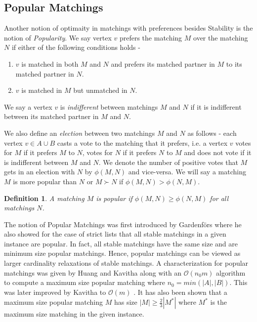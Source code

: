 \documentclass[a4paper,10pt]{article}
\theoremstyle{plain} %
\theoremstyle{plain} %
\newtheorem{definition}{Definition}[section] %
\begin{document}
\subsection{Popular Matchings}
Another notion of optimaity in matchings with preferences besides Stability is the notion of \textit{Popularity}. We say vertex $v$ prefers the matching $M$ over the matching $N$ if either of the following conditions holds - 
\begin{enumerate} [i]
    \item $v$ is matched in both $M$ and $N$ and prefers its matched partner in $M$ to its matched partner in $N$.
    \item $v$ is matched in $M$ but unmatched in $N$.
\end{enumerate}

We say a vertex $v$ is \textit{indifferent} between matchings $M$ and $N$ if it is indifferent between its matched partner in $M$ and $N$.


We also define an \textit{election} between two matchings $M$ and $N$ as follows - each vertex $v \in A \cup B$ casts a vote to the matching that it prefers, i.e. a vertex $v$ votes for $M$ if it prefers $M$ to $N$, votes for $N$ if it prefers $N$ to $M$ and does not vote if it is indifferent between $M$ and $N$. We denote the number of positive votes that $M$ gets in an election with $N$ by $\phi(M, N)$ and vice-versa. We will say a matching $M$ is more popular than $N$ or $M \succ N$ if $\phi(M, N) > \phi(N, M)$.

\begin{definition}
    A matching $M$ is popular if $\phi(M, N) \geq \phi(N, M)$ for all matchings $N$.
\end{definition}

The notion of Popular Matchings was first introduced by Gardenf\"ors \cite{gardenfors1975match} where he also showed for the case of strict lists that all stable matchings in a given instance are popular. In fact, all stable matchings have the same size \cite{gale1985some} and are minimum size popular matchings. Hence, popular matchings can be viewed as larger cardinality relaxations of stable matchings. A characterization for popular matchings was given by Huang and Kavitha \cite{huang2013popular} along with an $\mathcal{O}(n_0m)$ algorithm to compute a maximum size popular matching where $n_0 = min(|A|, |B|)$. This was later improved by Kavitha to $\mathcal{O}(m)$ \cite{kavitha2014size}. It has also been shown that a maximum size popular matching $M$ has size $|M| \geq \frac{2}{3}|M^*|$ where $M^*$ is the maximum size matching in the given instance.
\end{document}

